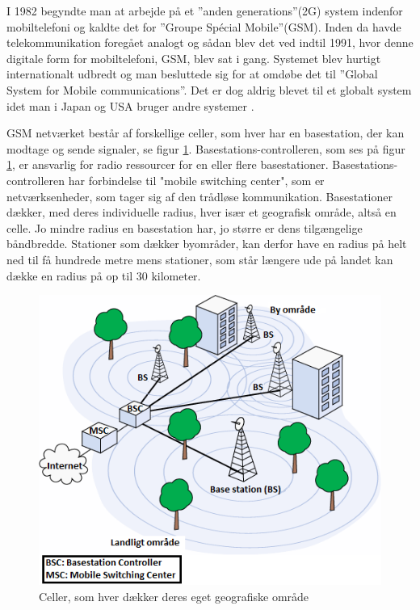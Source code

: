 I 1982 begyndte man at arbejde på et ”anden generations”(2G) system indenfor mobiltelefoni og kaldte det for ”Groupe Spécial Mobile”(GSM). Inden da havde telekommunikation foregået analogt og sådan blev det ved indtil 1991, hvor denne digitale form for mobiltelefoni, GSM, blev sat i gang. Systemet blev hurtigt internationalt udbredt og man besluttede sig for at omdøbe det til ”Global System for Mobile communications”. Det er dog aldrig blevet til et globalt system idet man i Japan og USA bruger andre systemer \cite{denstoredanske}.

GSM netværket består af forskellige celler, som hver har en basestation, der kan modtage og sende signaler, se figur \ref{celler}. Basestations-controlleren, som ses på figur \ref{celler}, er ansvarlig for radio ressourcer for en eller flere basestationer. Basestations-controlleren har forbindelse til "mobile switching center", som er netværksenheder, som tager sig af den trådløse kommunikation. Basestationer dækker, med deres individuelle radius, hver især et geografisk område, altså en celle. Jo mindre radius en basestation har, jo større er dens tilgængelige båndbredde. Stationer som dækker byområder, kan derfor have en radius på helt ned til få hundrede metre mens stationer, som står længere ude på landet kan dække en radius på op til 30 kilometer. \cite{techviral}

\begin{figure}[H]
\centering
\includegraphics []{Billeder/celler.png}
\caption {Celler, som hver dækker deres eget geografiske område \cite{techviral}}
\label {celler}
\end{figure} 

